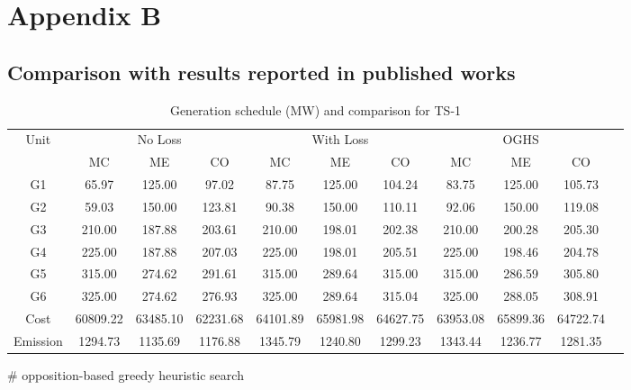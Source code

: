 \chapter{Appendix B}

\section*{Comparison with results reported in published works}

\setcounter{table}{0}
\renewcommand{\thetable}{B.\arabic{table}}

\begin{table*}[!htbp]
\centering
\renewcommand{\arraystretch}{1.3}
\caption{Generation schedule (MW) and comparison for TS-1}
\label{table_ts1}
\begin{threeparttable}[c]
\scalebox{0.7} {
\begin{tabular}{|c|c|c|c|c|c|c|c|c|c|c|}
\hline
\multirow{2}{*}{Unit} & \multicolumn{3}{c|}{No Loss} & \multicolumn{3}{c|}{With Loss} & \multicolumn{3}{c|}{OGHS\tnote{\#} \cite{16EPESedGreedy}} \\\cline{2-10}
 & MC & ME & CO & MC & ME & CO & MC & ME & CO\\
\hline
G1	&	65.97	&	125.00	&	97.02	&	87.75	&	125.00	&	104.24 &	83.75	&	125.00	&	105.73\\
\hline
G2	&	59.03	&	150.00	&	123.81	&	90.38	&	150.00	&	110.11 &	92.06	&	150.00	&	119.08\\
\hline
G3	&	210.00	&	187.88	&	203.61	&	210.00	&	198.01	&	202.38 &	210.00	&	200.28	&	205.30\\
\hline
G4	&	225.00	&	187.88	&	207.03	&	225.00	&	198.01	&	205.51 &	225.00	&	198.46	&	204.78\\
\hline
G5	&	315.00	&	274.62	&	291.61	&	315.00	&	289.64	&	315.00 &	315.00	&	286.59	&	305.80\\
\hline
G6	&	325.00	&	274.62	&	276.93	&	325.00	&	289.64	&	315.04 &	325.00	&	288.05	&	308.91\\
\hline
Cost	&	60809.22	&	63485.10	&	62231.68	&	64101.89	&	65981.98	&	64627.75 &	63953.08	&	65899.36	&	64722.74\\
\hline
Emission	&	1294.73	&	1135.69	&	1176.88	&	1345.79	&	1240.80	&	1299.23 &	1343.44	&	1236.77	&	1281.35\\
\hline
\end{tabular}
}
\begin{tablenotes}
\item[\#] opposition-based greedy heuristic search
\end{tablenotes}
\end{threeparttable}
\end{table*}

